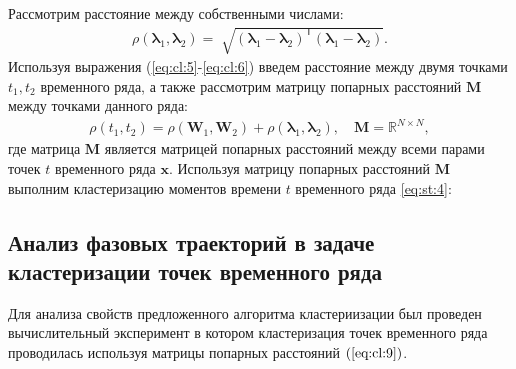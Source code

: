 Рассмотрим расстояние между собственными числами:
\[
\label{eq:cl:6}
\begin{aligned}
\rho\left(\bm{\lambda}_1, \bm{\lambda}_2\right) = \sqrt[]{\left(\bm{\lambda}_1 - \bm{\lambda}_2\right)^{\mathsf{T}}\left(\bm{\lambda}_1 - \bm{\lambda}_2\right)}.
\end{aligned}
\]
Используя выражения (\ref{eq:cl:5}-\ref{eq:cl:6}) введем расстояние между двумя точками $t_1, t_2$ временного ряда, а также рассмотрим матрицу попарных расстояний $\textbf{M}$ между точками данного ряда:
\[
\label{eq:cl:9}
\begin{aligned}
\rho\left(t_1, t_2\right) = \rho\left(\textbf{W}_1, \textbf{W}_2\right) + \rho\left(\bm{\lambda}_1, \bm{\lambda}_2\right), \quad \textbf{M} =  \mathbb{R}^{N\times N},
\end{aligned}
\]
где %
матрица $\textbf{M}$ является матрицей попарных расстояний между всеми парами точек $t$ временного ряда $\textbf{x}$.
Используя матрицу попарных расстояний $\textbf{M}$ выполним кластеризацию моментов времени $t$ временного ряда \eqref{eq:st:4}:


\subsection{Анализ фазовых траекторий в задаче кластеризации точек временного ряда}
Для анализа свойств предложенного алгоритма кластериизации был проведен вычислительный эксперимент в котором кластеризация точек временного ряда проводилась используя матрицы попарных расстояний $(\ref{eq:cl:9})$.

